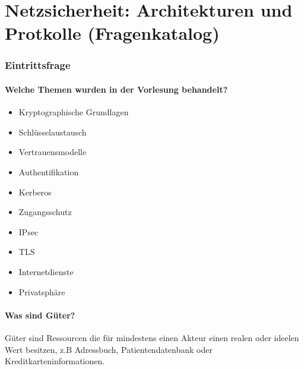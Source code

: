 \chapter{Netzsicherheit: Architekturen und Protkolle (Fragenkatalog)}

\subsection{Eintrittsfrage}
	\subsubsection{Welche Themen wurden in der Vorlesung behandelt?}
		\begin{itemize}
			\item{Kryptographische Grundlagen}
			\item{Schlüsselaustausch}
			\item{Vertrauensmodelle}
			\item{Authentifikation}
			\item{Kerberos}
			\item{Zugangsschutz}
			\item{IPsec}
			\item{TLS}
			\item{Internetdienste}
			\item{Privatsphäre}
		\end{itemize}
		
	\subsubsection{Was sind Güter?}
	Güter sind Ressourcen die für mindestens einen Akteur einen realen oder ideelen Wert besitzen, z.B Adressbuch, Patientendatenbank oder Kreditkarteninformationen.
	
